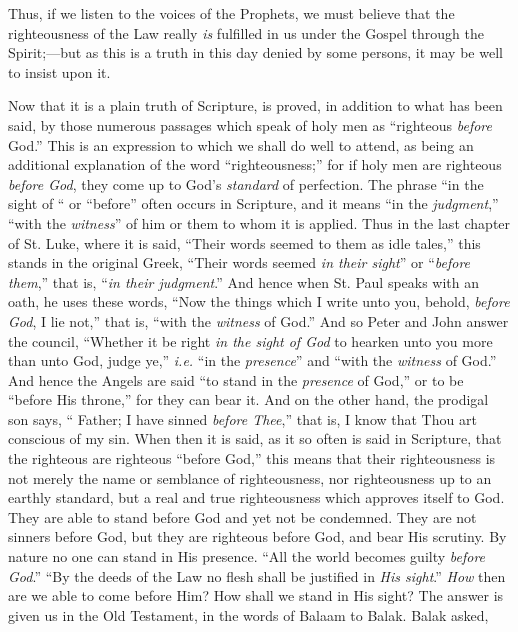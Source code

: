 Thus, if we listen to the voices of the Prophets, we must believe
that the righteousness of the Law really \emph{is} fulfilled in us
under the Gospel through the Spirit;—but as this is a truth in this
day denied by some persons, it may be well to insist upon it.

Now that it is a plain truth of Scripture, is proved, in addition
to what has been said, by those numerous passages which speak of holy
men as ``righteous \emph{before} God.'' This is an expression
to which we shall do well to attend, as being an additional
explanation of the word ``righteousness;'' for if holy men are
righteous \emph{before God}, they come up to God's \emph{standard} of
perfection. The phrase ``in the sight of `` or
``before'' often occurs in Scripture, and it means ``in
the \emph{judgment},'' ``with the \emph{witness}'' of him or them
to whom it is applied. Thus in the last chapter of St. Luke, where it
is said, ``Their words seemed to them as idle tales,'' this
stands in the original Greek, ``Their words seemed \emph{in their
sight}'' or ``\emph{before them},'' that is, ``\emph{in
their judgment}.'' And hence when St. Paul speaks with an
oath, he uses these words, ``Now the things which I write unto
you, behold, \emph{before God}, I lie not,'' that is, ``with
the \emph{witness} of God.'' And so Peter and John answer the
council, ``Whether it be right \emph{in the sight of God} to
hearken unto you more than unto God, judge ye,'' \emph{i.e.}
``in the \emph{presence}'' and ``with the \emph{witness}
of God.'' And hence the Angels are said ``to stand in the \emph{presence}
of God,'' or to be ``before His throne,'' for they can
bear it. And on the other hand, the prodigal son says, `` Father;
I have sinned \emph{before Thee},'' that is, I know that Thou art
conscious of my sin. When then it is said, as it so often is said in
Scripture, that the righteous are righteous ``before God,''
this means that their righteousness is not merely the name or
semblance of righteousness, nor righteousness up to an earthly
standard, but a real and true righteousness which approves itself to
God. They are able to stand before God and yet not be condemned. They
are not sinners before God, but they are righteous before God, and
bear His scrutiny. By nature no one can stand in His presence.
``All the world becomes guilty \emph{before} \emph{God}.''
``By the deeds of the Law no flesh shall be justified in \emph{His
sight}.'' \emph{How} then are we able to come before Him? How
shall we stand in His sight? The answer is given us in the Old
Testament, in the words of Balaam to Balak. Balak asked,
